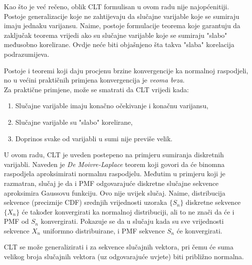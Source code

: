 Kao što je već rečeno, oblik CLT formulisan u ovom radu nije najopćenitiji.
Postoje generalizacije koje ne zahtijevaju da slučajne varijable koje se
sumiraju imaju jednaku varijansu. Naime, postoje formulacije teorema koje
garantuju da zaključak teorema vrijedi ako su slučajne varijable koje se
sumiraju "slabo" međusobno korelirane. Ovdje neće biti objašnjeno šta takva
"slaba" korelacija podrazumijeva.

Postoje i teoremi koji daju procjenu brzine
konvergencije ka normalnoj raspodjeli, no u većini praktičnih primjena
konvergencija je \textit{veoma brza}. \\
%
Za praktične primjene, može se smatrati da CLT vrijedi kada:

\begin{enumerate}
  \item Slučajne varijable imaju konačno očekivanje i konačnu varijansu,
  \item Slučajne varijable su "slabo" korelirane,
  \item Doprinos svake od varijabli u sumi nije previše velik.
\end{enumerate}

U ovom radu, CLT je uveden postepeno na primjeru sumiranja diskretnih varijabli.
Naveden je \textit{De Moivre-Laplace} teorem koji govori da će binomna
raspodjela aproksimirati normalnu raspodjelu. Međutim u primjeru koji je
razmatran, slučaj je da i PMF odgovarajuće diskretne slučajne sekvence
aproksimira Gaussovu funkciju. Ovo nije uvijek slučaj. Naime, distribucija
sekvence (preciznije CDF) srednjih vrijednosti uzoraka $\{S_n\}$ diskretne
sekvence $\{X_n\}$ će također konvergirati ka normalnoj distribuciji, ali to ne
znači da će i PMF od $S_n$ konvergirati. Pokazuje se da u slučaju kada su sve
vrijednosti sekvence $X_n$ uniformno distribuirane, i PMF sekvence $S_n$ će
konvergirati.

CLT se može generalizirati i za sekvence slučajnih vektora, pri čemu će suma
velikog broja slučajnih vektora (uz odgovarajuće uvjete) biti približno
normalna.

